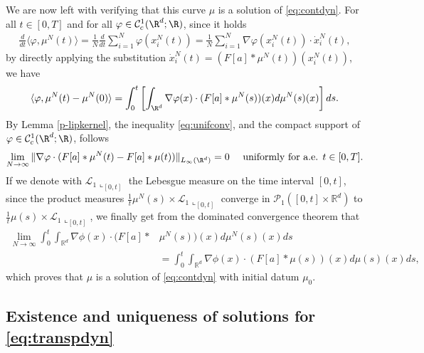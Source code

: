 We are now left with verifying that this curve $\mu$ is a solution of \eqref{eq:contdyn}. For all $t \in [0,T]$ and for all $\varphi \in \mathcal{C}^1_c(\R^d;\R)$, since it holds
\begin{align*}
\frac{d}{dt}\langle \varphi, \mu^N(t) \rangle = \frac{1}{N}\frac{d}{dt} \sum^N_{i = 1} \varphi(x^N_i(t)) = \frac{1}{N} \sum^N_{i = 1} \nabla\varphi(x^N_i(t)) \cdot \dot{x}_i^N(t),
\end{align*}
by directly applying the substitution $\dot{x}_i^N(t) = (F[a]*\mu^N(t))(x^N_i(t))$, we have
\begin{align*}
\langle \varphi, \mu^N(t) - \mu^N(0) \rangle = \int^t_0 \left[ \int_{\R^d}\nabla \varphi(x) \cdot (F[a]*\mu^N(s))(x) d\mu^N(s)(x) \right] ds.
\end{align*}
By Lemma \ref{p-lipkernel}, the inequality \eqref{eq:unifconv}, and the compact support of $\varphi \in \mathcal{C}^1_c(\R^d;\R)$, follows
\begin{align*}
\lim_{N \rightarrow \infty} \|\nabla\varphi \cdot (F[a]*\mu^N(t) - F[a]*\mu(t))\|_{L_{\infty}(\R^d)} = 0 \quad \text{ uniformly for a.e. } t \in [0,T].
\end{align*}
If we denote with $\mathcal L_1\llcorner_{[0,t]}$ the Lebesgue measure on the time interval $[0,t]$, since the product measures $\frac{1}{t} \mu^{N}(s) \times \mathcal L_1\llcorner_{[0,t]}$ converge in $\mathcal P_1([0,t] \times \mathbb R^{d})$ to $\frac{1}{t} \mu(s) \times \mathcal L_1\llcorner_{[0,t]}$, we finally get from the dominated convergence theorem that
\begin{align*}
\lim_{N \to \infty} \int_0^{t} \int_{\mathbb R^{d}} \nabla \phi(x) \cdot (F[a]*&\mu^N(s))(x) d\mu^N(s)(x) ds \\
&=  \int_0^{t} \int_{\mathbb R^{d}} \nabla \phi(x) \cdot (F[a]*\mu(s))(x) d \mu(s)(x) ds,
\end{align*}
which proves that $\mu$ is a solution of \eqref{eq:contdyn} with initial datum $\mu_0$.


\subsection{Existence and uniqueness of solutions for  \eqref{eq:transpdyn}}\label{ap3}

